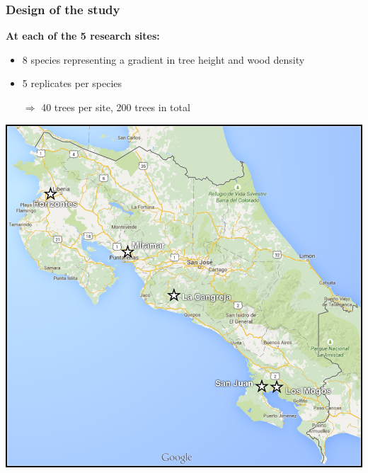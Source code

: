 \documentclass[usepdftitle=false]{beamer}
\newcommand{\Rar}{$\Rightarrow$}
\newcommand{\tw}{\textwidth}
\begin{document}
\begin{frame}
	\frametitle{Design of the study}
	\begin{minipage}{0.5\tw}
		\textbf{ At each of the 5 research sites:}
		\begin{itemize}[<+-| alert@+>]
			\item 8 species representing a gradient in tree height and wood density
			\item 5 replicates per species
			\item[\Rar] 40 trees per site, 200 trees in total
		\end{itemize}	
	\end{minipage}
	\begin{minipage}{0.48\tw}
		\includegraphics[width = \tw]{figures/map_01_all_sites.png}  	
	\end{minipage}
\end{frame}
\end{document}

